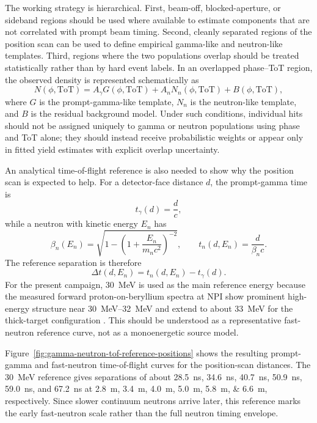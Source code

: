 The working strategy is hierarchical. First, beam-off, blocked-aperture, or sideband regions should be used where available to estimate components that are not correlated with prompt beam timing. Second, cleanly separated regions of the position scan can be used to define empirical gamma-like and neutron-like templates. Third, regions where the two populations overlap should be treated statistically rather than by hard event labels. In an overlapped phase--ToT region, the observed density is represented schematically as
\begin{equation}
N(\phi,\mathrm{ToT}) = A_{\gamma} G(\phi,\mathrm{ToT}) + A_{n} N_{n}(\phi,\mathrm{ToT}) + B(\phi,\mathrm{ToT}),
\end{equation}
where $G$ is the prompt-gamma-like template, $N_n$ is the neutron-like template, and $B$ is the residual background model. Under such conditions, individual hits should not be assigned uniquely to gamma or neutron populations using phase and ToT alone; they should instead receive probabilistic weights or appear only in fitted yield estimates with explicit overlap uncertainty.

An analytical time-of-flight reference is also needed to show why the position scan is expected to help. For a detector-face distance $d$, the prompt-gamma time is
\begin{equation}
t_{\gamma}(d) = \frac{d}{c},
\end{equation}
while a neutron with kinetic energy $E_n$ has
\begin{equation}
\beta_n(E_n) = \sqrt{1 - \left(1 + \frac{E_n}{m_n c^2}\right)^{-2}},
\qquad
t_n(d,E_n) = \frac{d}{\beta_n c}.
\end{equation}
The reference separation is therefore
\begin{equation}
\Delta t(d,E_n) = t_n(d,E_n) - t_{\gamma}(d).
\end{equation}
For the present campaign, \SI{30}{MeV} is used as the main reference energy because the measured forward proton-on-beryllium spectra at NPI show prominent high-energy structure near \SIrange{30}{32}{MeV} and extend to about \SI{33}{MeV} for the thick-target configuration \citep{Majerle2023PBeGenerator,Ansorge2025CollimatedBeams}. This should be understood as a representative fast-neutron reference curve, not as a monoenergetic source model.

Figure~\ref{fig:gamma-neutron-tof-reference-positions} shows the resulting prompt-gamma and fast-neutron time-of-flight curves for the position-scan distances. The \SI{30}{MeV} reference gives separations of about \SI{28.5}{ns}, \SI{34.6}{ns}, \SI{40.7}{ns}, \SI{50.9}{ns}, \SI{59.0}{ns}, and \SI{67.2}{ns} at \SIlist{2.8;3.4;4.0;5.0;5.8;6.6}{m}, respectively. Since slower continuum neutrons arrive later, this reference marks the early fast-neutron scale rather than the full neutron timing envelope.

